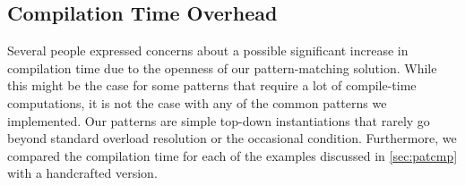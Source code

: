 \subsection{Compilation Time Overhead}
\label{sec:ctcmp}

Several people expressed concerns about a possible significant increase in 
compilation time due to the openness of our pattern-matching solution. While this 
might be the case for some patterns that require a lot of compile-time 
computations, it is not the case with any of the common patterns we implemented. Our patterns are 
simple top-down instantiations that rarely go beyond standard overload 
resolution or the occasional  condition. Furthermore, we compared the compilation 
time for each of the examples discussed in \textsection\ref{sec:patcmp}
with a handcrafted version.

